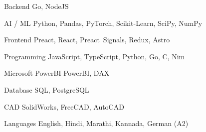 
\begin{cvskills}

  \cvskill
  {Backend} %
  {Go, NodeJS} %

  \cvskill
  {AI / ML}
  {Python, Pandas, PyTorch, Scikit-Learn, SciPy, NumPy}

  \cvskill
  {Frontend} %
  {Preact, React, \hbox{Preact Signals}, Redux, Astro} %

  \cvskill
  {Programming} %
  {JavaScript, TypeScript, Python, Go, C, Nim} %

  \cvskill
  {Microsoft PowerBI}
  {PowerBI, DAX}

  \cvskill
  {Database}
  {SQL, PostgreSQL}

  \cvskill
  {CAD}
  {SolidWorks, FreeCAD, AutoCAD}

  \cvskill
  {Languages} %
  {English, Hindi, Marathi, Kannada, German (A2)} %
\end{cvskills}
